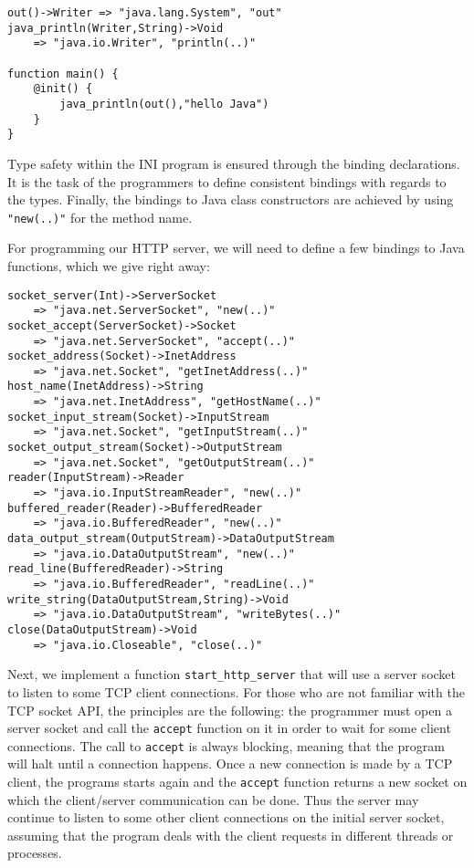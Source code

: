 \documentclass[11pt]{report}
\begin{document}
\begin{lstlisting}
out()->Writer => "java.lang.System", "out"
java_println(Writer,String)->Void
	=> "java.io.Writer", "println(..)"

function main() {
	@init() {
		java_println(out(),"hello Java")
	}
}
\end{lstlisting}

Type safety within the INI program is ensured through the binding declarations. It is the task of the programmers to define consistent bindings with regards to the types. Finally, the bindings to Java class constructors are achieved by using \texttt{"new(..)"} for the method name.

For programming our HTTP server, we will need to define a few bindings to Java functions, which we give right away:

{\small \begin{lstlisting}
socket_server(Int)->ServerSocket
	=> "java.net.ServerSocket", "new(..)"
socket_accept(ServerSocket)->Socket
	=> "java.net.ServerSocket", "accept(..)"
socket_address(Socket)->InetAddress
	=> "java.net.Socket", "getInetAddress(..)"
host_name(InetAddress)->String
	=> "java.net.InetAddress", "getHostName(..)"
socket_input_stream(Socket)->InputStream
	=> "java.net.Socket", "getInputStream(..)"
socket_output_stream(Socket)->OutputStream
	=> "java.net.Socket", "getOutputStream(..)"
reader(InputStream)->Reader
	=> "java.io.InputStreamReader", "new(..)"
buffered_reader(Reader)->BufferedReader
	=> "java.io.BufferedReader", "new(..)"
data_output_stream(OutputStream)->DataOutputStream
	=> "java.io.DataOutputStream", "new(..)"
read_line(BufferedReader)->String
	=> "java.io.BufferedReader", "readLine(..)"
write_string(DataOutputStream,String)->Void
	=> "java.io.DataOutputStream", "writeBytes(..)"
close(DataOutputStream)->Void
	=> "java.io.Closeable", "close(..)"
\end{lstlisting} }

Next, we implement a function \texttt{start\_http\_server} that will use a server socket to listen to some TCP client connections. For those who are not familiar with the TCP socket API, the principles are the following: the programmer must open a server socket and call the \texttt{accept} function on it in order to wait for some client connections. The call to \texttt{accept} is always blocking, meaning that the program will halt until a connection happens. Once a new connection is made by a TCP client, the programs starts again and the \texttt{accept} function returns a  new socket on which the client/server communication can be done. Thus the server may continue to listen to some other client connections on the initial server socket, assuming that the program deals with the client requests in different threads or processes.
\end{document}
